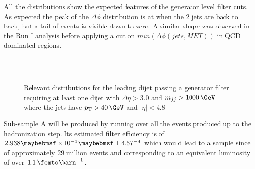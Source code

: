 All the distributions show the expected features of the generator level filter cuts. As expected the peak of the $\Delta\phi$ distribution is at \pi when the 2 jets are back to back, but a tail of events is visible down to zero. A similar shape was observed in the Run I analysis before applying a cut on $min(\Delta\phi(jets,MET))$ in QCD dominated regions.

\begin{figure}[!htp]%
\centering
{}\qquad
{}\\
\\
\caption{Relevant distributions for the leading dijet passing a generator filter requiring at least one dijet with $\Delta\eta>3.0$ and $m_{jj}>1000\,\GeV$ where the jets have $\pt>40\,\GeV$ and $|\eta|<4.8$}
\label{FIGURE:RunIIPreparation_PassGeneratorFilterDistributions2}
\end{figure}

Sub-sample A will be produced by running over all the events produced up to the hadronization step. Its estimated filter efficiency is of $2.938 \times 10^{-1} \pm 4.67 \time 10^{-4}$ which would lead to a sample since of approximately 29 million events and corresponding to an equivalent luminosity of over $1.1\,\femto\barn^{-1}$.


